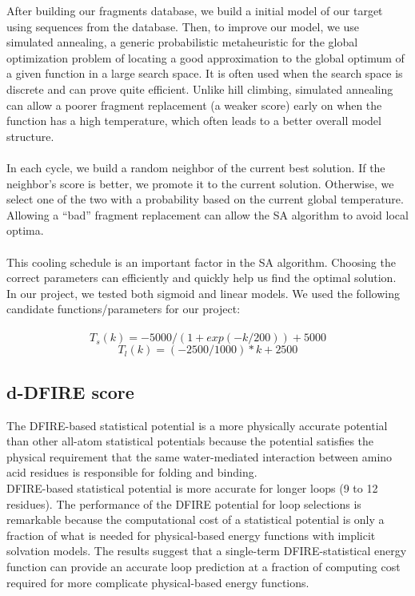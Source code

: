 \documentclass{article}
\begin{document}
\begin{enumerate}
After building our fragments database, we build a initial model of our target using sequences from the database. Then, to improve our model, we use simulated annealing, a generic probabilistic metaheuristic for the global optimization problem of locating a good approximation to the global optimum of a given function in a large search space. It is often used when the search space is discrete and can prove quite efficient. Unlike hill climbing, simulated annealing can allow a poorer fragment replacement (a weaker score) early on when the function has a high temperature, which often leads to a better overall model structure. \\\\
In each cycle, we build a random neighbor of the current best solution. If the neighbor’s score is better, we promote it to  the current solution. Otherwise, we select one of the two with a probability based on the current global temperature.  Allowing a “bad” fragment replacement can allow the SA algorithm to avoid local optima.  \\\\
     This cooling schedule is an important factor in the SA algorithm. Choosing the correct parameters can efficiently and quickly help us find the optimal solution. In our project, we tested both sigmoid and linear models. We used the following candidate functions/parameters for our project:\\\\
\begin{equation*}
      T_s(k) =  -5000/(1+ exp(-k/200))+5000
    \end{equation*}
\begin{equation*}
      T_l(k) =  (-2500/1000)*k + 2500
    \end{equation*}



\subsection{d-DFIRE score}

The DFIRE-based statistical potential is a more physically accurate potential than other all-atom statistical potentials because the potential satisfies the physical requirement that the same water-mediated interaction between amino acid residues is responsible for folding and binding. \\

DFIRE-based statistical potential is more accurate for longer loops (9 to 12 residues). The performance of the DFIRE potential for loop selections is remarkable because the computational cost of a statistical potential is only a fraction of what is needed for physical-based energy functions with implicit solvation models. The results suggest that a single-term DFIRE-statistical energy function can provide an accurate loop prediction at a fraction of computing cost required for more complicate physical-based energy functions.


\end{enumerate}
\end{document}
